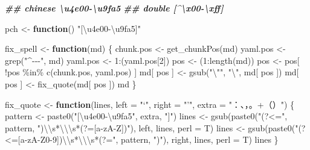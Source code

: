\documentclass[
]{article}
\newenvironment{Shaded}{\begin{snugshade}}{\end{snugshade}}
\newcommand{\AttributeTok}[1]{\textcolor[rgb]{0.77,0.63,0.00}{#1}}
\newcommand{\ControlFlowTok}[1]{\textcolor[rgb]{0.13,0.29,0.53}{\textbf{#1}}}
\newcommand{\DecValTok}[1]{\textcolor[rgb]{0.00,0.00,0.81}{#1}}
\newcommand{\DocumentationTok}[1]{\textcolor[rgb]{0.56,0.35,0.01}{\textbf{\textit{#1}}}}
\newcommand{\FunctionTok}[1]{\textcolor[rgb]{0.00,0.00,0.00}{#1}}
\newcommand{\NormalTok}[1]{#1}
\newcommand{\OtherTok}[1]{\textcolor[rgb]{0.56,0.35,0.01}{#1}}
\newcommand{\SpecialCharTok}[1]{\textcolor[rgb]{0.00,0.00,0.00}{#1}}
\newcommand{\StringTok}[1]{\textcolor[rgb]{0.31,0.60,0.02}{#1}}
\begin{document}
\begin{Shaded}
\begin{Highlighting}[]
\DocumentationTok{\#\# chinese \textbackslash{}u4e00{-}\textbackslash{}u9fa5}
\DocumentationTok{\#\# double [\^{}\textbackslash{}x00{-}\textbackslash{}xff] }

\NormalTok{pch }\OtherTok{\textless{}{-}} \ControlFlowTok{function}\NormalTok{() }\StringTok{"[\textbackslash{}u4e00{-}\textbackslash{}u9fa5]"}

\NormalTok{fix\_spell }\OtherTok{\textless{}{-}} \ControlFlowTok{function}\NormalTok{(md) \{}
\NormalTok{  chunk.pos }\OtherTok{\textless{}{-}} \FunctionTok{get\_chunkPos}\NormalTok{(md)}
\NormalTok{  yaml.pos }\OtherTok{\textless{}{-}} \FunctionTok{grep}\NormalTok{(}\StringTok{"\^{}{-}{-}{-}"}\NormalTok{, md)}
\NormalTok{  yaml.pos }\OtherTok{\textless{}{-}} \DecValTok{1}\SpecialCharTok{:}\NormalTok{(yaml.pos[}\DecValTok{2}\NormalTok{])}
\NormalTok{  pos }\OtherTok{\textless{}{-}}\NormalTok{ (}\DecValTok{1}\SpecialCharTok{:}\FunctionTok{length}\NormalTok{(md))}
\NormalTok{  pos }\OtherTok{\textless{}{-}}\NormalTok{ pos[ }\SpecialCharTok{!}\NormalTok{pos }\SpecialCharTok{\%in\%} \FunctionTok{c}\NormalTok{(chunk.pos, yaml.pos) ]}
\NormalTok{  md[ pos ] }\OtherTok{\textless{}{-}} \FunctionTok{gsub}\NormalTok{(}\StringTok{"}\SpecialCharTok{\textbackslash{}"}\StringTok{"}\NormalTok{,  }\StringTok{"}\SpecialCharTok{\textbackslash{}\textquotesingle{}}\StringTok{"}\NormalTok{, md[ pos ])}
\NormalTok{  md[ pos ] }\OtherTok{\textless{}{-}} \FunctionTok{fix\_quote}\NormalTok{(md[ pos ])}
\NormalTok{  md}
\NormalTok{\}}

\NormalTok{fix\_quote }\OtherTok{\textless{}{-}} \ControlFlowTok{function}\NormalTok{(lines, }\AttributeTok{left =} \StringTok{"‘"}\NormalTok{, }\AttributeTok{right =} \StringTok{"’"}\NormalTok{, }\AttributeTok{extra =} \StringTok{"：、，。+（）"}\NormalTok{) \{}
\NormalTok{  pattern }\OtherTok{\textless{}{-}} \FunctionTok{paste0}\NormalTok{(}\StringTok{"[\textbackslash{}u4e00{-}\textbackslash{}u9fa5"}\NormalTok{, extra, }\StringTok{"]"}\NormalTok{)}
\NormalTok{  lines }\OtherTok{\textless{}{-}} \FunctionTok{gsub}\NormalTok{(}\FunctionTok{paste0}\NormalTok{(}\StringTok{"(?\textless{}="}\NormalTok{, pattern, }\StringTok{")}\SpecialCharTok{\textbackslash{}\textbackslash{}}\StringTok{s*}\SpecialCharTok{\textbackslash{}\textquotesingle{}\textbackslash{}\textbackslash{}}\StringTok{s*(?=[a{-}zA{-}Z])"}\NormalTok{), left, lines, }\AttributeTok{perl =}\NormalTok{ T)}
\NormalTok{  lines }\OtherTok{\textless{}{-}} \FunctionTok{gsub}\NormalTok{(}\FunctionTok{paste0}\NormalTok{(}\StringTok{"(?\textless{}=[a{-}zA{-}Z0{-}9])}\SpecialCharTok{\textbackslash{}\textbackslash{}}\StringTok{s*}\SpecialCharTok{\textbackslash{}\textquotesingle{}\textbackslash{}\textbackslash{}}\StringTok{s*(?="}\NormalTok{, pattern, }\StringTok{")"}\NormalTok{), right, lines, }\AttributeTok{perl =}\NormalTok{ T)}
\NormalTok{  lines}
\NormalTok{\}}


\end{Highlighting}
\end{Shaded}
\end{document}
